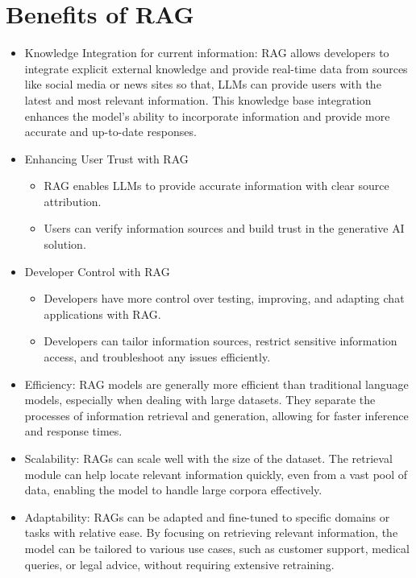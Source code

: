 \documentclass[../main.tex]{subfiles}
\begin{document}
\section{Benefits of RAG}
\begin{itemize}
	\item{Knowledge Integration for current information: RAG allows developers to integrate explicit external knowledge and provide real-time data from sources like social media or news sites so that, \gls{LLM}s can provide users with the latest and most relevant information. This knowledge base integration enhances the model's ability to incorporate information and provide more accurate and up-to-date responses.}
	\item{
			Enhancing User Trust with \gls{RAG}
			\begin{itemize}
				\item \gls{RAG} enables \gls{LLM}s to provide accurate information with clear source attribution.
				\item Users can verify information sources and build trust in the generative \gls{AI} solution.
			\end{itemize}
		}
	\item{
			Developer Control with \gls{RAG}
			\begin{itemize}
				\item Developers have more control over testing, improving, and adapting chat applications with \gls{RAG}.
				\item Developers can tailor information sources, restrict sensitive information access, and troubleshoot any issues efficiently.
			\end{itemize}
		}
	\item{Efficiency: RAG models are generally more efficient than traditional language models, especially when dealing with large datasets. They separate the processes of information retrieval and generation, allowing for faster inference and response times.}
	\item{Scalability: RAGs can scale well with the size of the dataset. The retrieval module can help locate relevant information quickly, even from a vast pool of data, enabling the model to handle large corpora effectively.}
	\item{Adaptability: RAGs can be adapted and fine-tuned to specific domains or tasks with relative ease. By focusing on retrieving relevant information, the model can be tailored to various use cases, such as customer support, medical queries, or legal advice, without requiring extensive retraining.}

\end{itemize}
\end{document}
